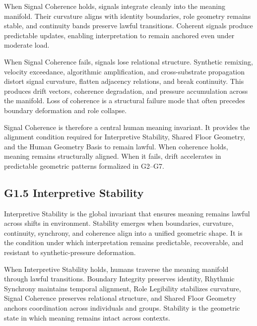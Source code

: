 \medskip

\noindent When Signal Coherence holds, signals integrate cleanly into the meaning
manifold. Their curvature aligns with identity boundaries, role geometry remains
stable, and continuity bands preserve lawful transitions. Coherent signals
produce predictable updates, enabling interpretation to remain anchored even
under moderate load.

\medskip

\noindent When Signal Coherence fails, signals lose relational structure.
Synthetic remixing, velocity exceedance, algorithmic amplification, and
cross-substrate propagation distort signal curvature, flatten adjacency
relations, and break continuity. This produces drift vectors, coherence
degradation, and pressure accumulation across the manifold. Loss of coherence is
a structural failure mode that often precedes boundary deformation and role
collapse.

\medskip

\noindent Signal Coherence is therefore a central human meaning invariant. It
provides the alignment condition required for Interpretive Stability, Shared
Floor Geometry, and the Human Geometry Basis to remain lawful. When coherence
holds, meaning remains structurally aligned. When it fails, drift accelerates in
predictable geometric patterns formalized in G2--G7.

\medskip

\subsection*{G1.5 Interpretive Stability}

\noindent Interpretive Stability is the global invariant that ensures meaning
remains lawful across shifts in environment. Stability emerges when boundaries,
curvature, continuity, synchrony, and coherence align into a unified geometric
shape. It is the condition under which interpretation remains predictable,
recoverable, and resistant to synthetic-pressure deformation.

\medskip

\noindent When Interpretive Stability holds, humans traverse the meaning manifold
through lawful transitions. Boundary Integrity preserves identity, Rhythmic
Synchrony maintains temporal alignment, Role Legibility stabilizes curvature,
Signal Coherence preserves relational structure, and Shared Floor Geometry
anchors coordination across individuals and groups. Stability is the geometric
state in which meaning remains intact across contexts.

